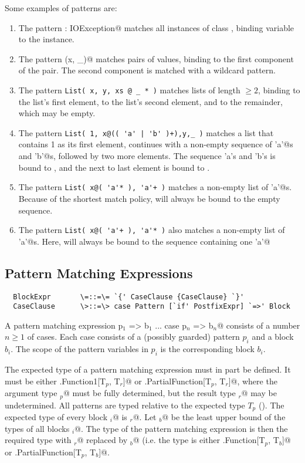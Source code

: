 \documentclass[11pt]{report}
\begin{document}
\example Some examples of patterns are:
\begin{enumerate}
\item
The pattern \verb@ex: IOException@ matches all instances of class
\verb@IOException@, binding variable \verb@ex@ to the instance.
\item
The pattern \verb@Pair(x, _)@ matches pairs of values, binding \verb@x@ to
the first component of the pair. The second component is matched
with a wildcard pattern.
\item
The pattern \verb+List( x, y, xs @ _ * )+ matches lists of length $\geq 2$,
binding \verb@x@ to the list's first element, \verb@y@ to the list's
second element, and \verb@xs@ to the remainder, which may be empty.
\item
The pattern \verb=List( 1, x@(( 'a' | 'b' )+),y,_ )= matches a list that
contains 1 as its first element, continues with a non-empty sequence of 
\verb@'a'@s and \verb@'b'@s, followed by two more elements. The sequence 'a's and 'b's
is bound to \verb@x@, and the next to last element is bound to \verb@y@.
\item
The pattern \verb=List( x@( 'a'* ), 'a'+ )= matches a non-empty list of
\verb@'a'@s. Because of the shortest match policy, \verb@x@ will always be bound to
the empty sequence.
\item
The pattern \verb=List( x@( 'a'+ ), 'a'* )= also matches a non-empty list of
\verb@'a'@s. Here, \verb@x@ will always be bound to
the sequence containing one \verb@'a'@
\end{enumerate}

\subsection{Pattern Matching Expressions}
\label{sec:pattern-match}

\syntax\begin{verbatim}
  BlockExpr       \=::=\= `{' CaseClause {CaseClause} `}'
  CaseClause      \>::=\> case Pattern [`if' PostfixExpr] `=>' Block 
\end{verbatim}

A pattern matching expression
\verb@case p$_1$ => b$_1$ ... case p$_n$ => b$_n$@ consists of a number 
$n \geq 1$ of cases. Each case consists of a (possibly guarded) pattern 
$p_i$ and a block $b_i$.  The scope of the pattern variables in $p_i$ is 
the corresponding block $b_i$.

The expected type of a pattern matching expression must in part be
defined. It must be either \verb@scala.Function1[T$_p$, T$_r$]@ or
\verb@scala.PartialFunction[T$_p$, T$_r$]@, where the argument type
\verb@T$_p$@ must be fully determined, but the result type
\verb@T$_r$@ may be undetermined.  All patterns are typed
relative to the expected type $T_p$ ().  The expected type of
every block \verb@b$_i$@ is \verb@T$_r$@.
Let \verb@T$_b$@ be the least upper bound of the types of all blocks 
\verb@b$_i$@. The type of the pattern matching expression is
then the required type with \verb@T$_r$@ replaced by \verb@T$_b$@
(i.e. the type is either \verb@scala.Function[T$_p$, T$_b$]@ or
\verb@scala.PartialFunction[T$_p$, T$_b$]@.
\end{document}
